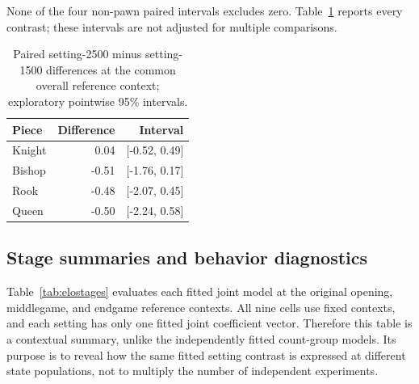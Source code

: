 \documentclass{jcst}
\begin{document}
None of the four non-pawn paired intervals excludes zero. Table~\ref{tab:elocontrast} reports every contrast; these intervals are not adjusted for multiple comparisons.
\begin{table}[tbp]\centering
\small
\caption{Paired setting-2500 minus setting-1500 differences at the common overall reference context; exploratory pointwise 95\% intervals.}\label{tab:elocontrast}
\begin{tabular}{lrr}
\toprule
Piece & Difference & Interval\\\midrule
Knight & 0.04 & [-0.52, 0.49]\\
Bishop & -0.51 & [-1.76, 0.17]\\
Rook & -0.48 & [-2.07, 0.45]\\
Queen & -0.50 & [-2.24, 0.58]\\
\bottomrule\end{tabular}\end{table}

\subsection{Stage summaries and behavior diagnostics}
Table~\ref{tab:elostages} evaluates each fitted joint model at the original opening, middlegame, and endgame reference contexts. All nine cells use fixed contexts, and each setting has only one fitted joint coefficient vector. Therefore this table is a contextual summary, unlike the independently fitted count-group models. Its purpose is to reveal how the same fitted setting contrast is expressed at different state populations, not to multiply the number of independent experiments.
\end{document}
